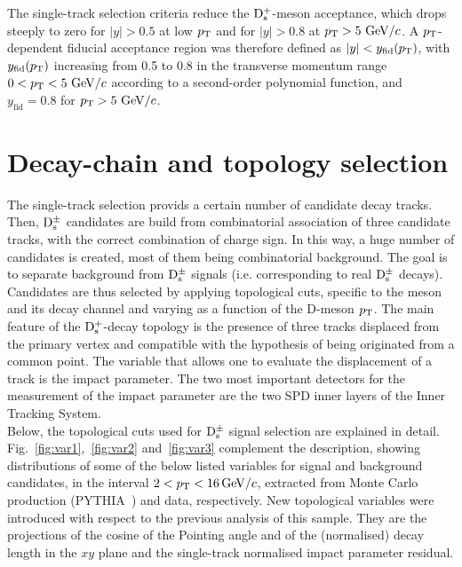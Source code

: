 The single-track selection criteria reduce the ${\rm D_s^+}$-meson acceptance, which drops 
steeply to zero for $|y| > 0.5$ at low $p_{\rm T}$ and for $|y| > 0.8$ 
at $p_{\rm T} > 5~\mathrm{GeV}/c$. A $p_{\rm T}$-dependent fiducial acceptance region was therefore defined as 
$|y| < y_{\mathrm{fid}}(p_{\rm T})$, with $y_{\mathrm{fid}}(p_{\rm T})$ increasing 
from 0.5 to 0.8 in the transverse momentum range $0 < p_{\rm T} < 5~\mathrm{GeV}/c$ 
according to a second-order polynomial function, and $y_{\mathrm{fid}}=0.8$ 
for $p_{\rm T} > 5~\mathrm{GeV}/c$.

\section{Decay-chain and topology selection}

The single-track selection provids a certain number of candidate
 decay tracks. Then, ${\rm D_s^{\pm}}$ candidates are build from combinatorial 
 association of three candidate tracks, with the correct combination of charge 
 sign. In this way, a huge number of candidates is created, most of them 
 being combinatorial background. The goal is to separate background from
  ${\rm D_s^{\pm}}$ signals (i.e. corresponding to real  ${\rm D_s^{\pm}}$ decays). Candidates 
  are thus selected by applying topological cuts, specific to the meson and its 
  decay channel and varying as a function of the D-meson $p_{\rm T}$.
The main feature of the ${\rm D_s^+}$-decay topology is the presence of three tracks displaced from 
the primary vertex and compatible with the hypothesis of being originated from 
a common point. 
The variable that allows one to evaluate the displacement of a track is the 
impact parameter. The two most important detectors for the measurement
 of the impact parameter are the two SPD inner layers of the Inner Tracking System. \\
Below, the topological cuts used for ${\rm D_s^{\pm}}$ signal selection
 are explained in detail. Fig.~\ref{fig:var1},~\ref{fig:var2} and~\ref{fig:var3} complement
 the description, showing distributions of some of the below listed variables
 for signal and background candidates, in the interval $2 < p_{\rm T} < 16 \, \mathrm{GeV}/c$, 
 extracted from Monte Carlo production (PYTHIA~\cite{Sjostrand:2006za}) and data, respectively.
  New topological variables were introduced with respect to the 
  previous analysis of this sample. They are the projections of the cosine of 
the Pointing angle and of the (normalised) decay length in the $xy$ plane 
 and the single-track normalised impact parameter residual.
